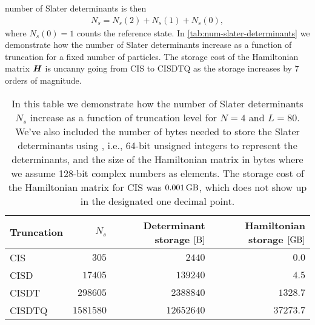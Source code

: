             number of Slater determinants is then
            \begin{align}
                N_s = N_s(2) + N_s(1) + N_s(0),
            \end{align}
            where $N_s(0) = 1$ counts the reference state.
            In \autoref{tab:num-slater-determinants} we demonstrate how the
            number of Slater determinants increase as a function of truncation
            for a fixed number of particles.
            The storage cost of the Hamiltonian matrix $\boldsymbol{H}$ is uncanny
            going from CIS to CISDTQ as the storage increases by $7$ orders of
            magnitude.
            \begin{table}
                \centering
                \caption{In this table we demonstrate how the number of
                Slater determinants $N_s$ increase as a function of truncation
                level for $N = 4$ and $L = 80$.
                We've also included the number of bytes needed to store the
                Slater determinants using , i.e., 64-bit
                unsigned integers to represent the determinants, and the size of
                the Hamiltonian matrix in bytes where we assume 128-bit complex
                numbers as elements.
                The storage cost of the Hamiltonian matrix for CIS was
                $\SI{0.001}{\giga\byte}$, which does not show up in the
                designated one decimal point.}
                \renewcommand{\arraystretch}{1.3}
                \begin{tabular}{@{}lrrr@{}}
                    \toprule
                    Truncation & $N_s$ & Determinant storage $[\si{\byte}]$
                    & Hamiltonian storage $[\si{\giga\byte}]$ \\
                    \midrule
                    CIS & $305$ & $2440$ & $0.0$ \\
                    CISD & $17405$ & $139240$ & $4.5$ \\
                    CISDT & $298605$ & $2388840$ & $1328.7$ \\
                    CISDTQ & $1581580$ & $12652640$ & $37273.7$ \\
                    \bottomrule
                \end{tabular}
                \label{tab:num-slater-determinants}
            \end{table}

